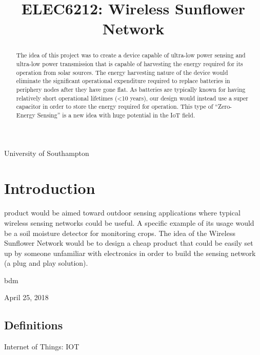 \documentclass[journal]{IEEEtran}
\begin{document}
%
\title{ELEC6212: Wireless Sunflower Network}
\author{
}

%
{University of Southampton}

\maketitle

\begin{abstract}
The idea of this project was to create a device capable of ultra-low power sensing and ultra-low power transmission that is capable of harvesting the energy required for its operation from solar sources. The energy harvesting nature of the device would eliminate the significant operational expenditure required to replace batteries in periphery nodes after they have gone flat. As batteries are typically known for having relatively short operational lifetimes (<10 years), our design would instead use a super capacitor in order to store the energy required for operation. This type of “Zero-Energy Sensing” is a new idea with huge potential in the IoT field.
\end{abstract}

\section{Introduction}
 product would be aimed toward outdoor sensing applications where typical wireless sensing networks could be useful. A specific example of its usage would be a soil moisture detector for monitoring crops. The idea of the Wireless Sunflower Network would be to design a cheap product that could be easily set up by someone unfamiliar with electronics in order to build the sensing network (a plug and play solution).

\hfill bdm

\hfill April 25, 2018

\subsection{Definitions}
Internet of Things: IOT
\end{document}
